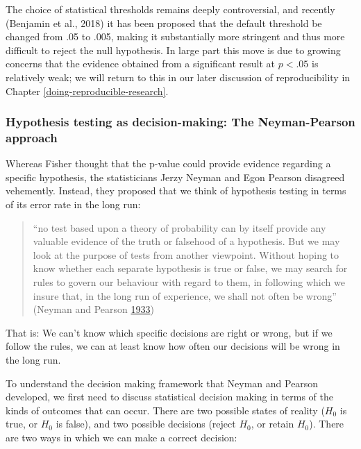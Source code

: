 \documentclass[12pt,]{book}
\theoremstyle{definition}
\theoremstyle{definition}
\theoremstyle{definition}
\theoremstyle{remark}
\begin{document}
The choice of statistical thresholds remains deeply controversial, and recently (Benjamin et al., 2018) it has been proposed that the default threshold be changed from .05 to .005, making it substantially more stringent and thus more difficult to reject the null hypothesis. In large part this move is due to growing concerns that the evidence obtained from a significant result at \(p < .05\) is relatively weak; we will return to this in our later discussion of reproducibility in Chapter \ref{doing-reproducible-research}.

\hypertarget{hypothesis-testing-as-decision-making-the-neyman-pearson-approach}{%
\subsubsection{Hypothesis testing as decision-making: The Neyman-Pearson approach}\label{hypothesis-testing-as-decision-making-the-neyman-pearson-approach}}

Whereas Fisher thought that the p-value could provide evidence regarding a specific hypothesis, the statisticians Jerzy Neyman and Egon Pearson disagreed vehemently. Instead, they proposed that we think of hypothesis testing in terms of its error rate in the long run:

\begin{quote}
``no test based upon a theory of probability can by itself provide any valuable evidence of the truth or falsehood of a hypothesis. But we may look at the purpose of tests from another viewpoint. Without hoping to know whether each separate hypothesis is true or false, we may search for rules to govern our behaviour with regard to them, in following which we insure that, in the long run of experience, we shall not often be wrong'' (Neyman and Pearson \protect\hyperlink{ref-Neyman289}{1933})
\end{quote}

That is: We can't know which specific decisions are right or wrong, but if we follow the rules, we can at least know how often our decisions will be wrong in the long run.

To understand the decision making framework that Neyman and Pearson developed, we first need to discuss statistical decision making in terms of the kinds of outcomes that can occur. There are two possible states of reality (\(H_0\) is true, or \(H_0\) is false), and two possible decisions (reject \(H_0\), or retain \(H_0\)). There are two ways in which we can make a correct decision:
\end{document}
